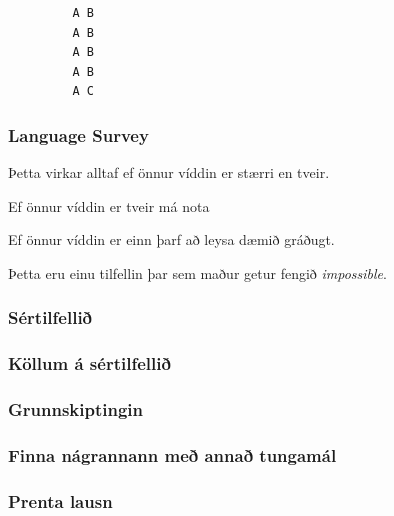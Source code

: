 { \begin{verbatim}
         A B
         A B
         A B
         A B
         A C
\end{verbatim} }

{
	\frametitle{Language Survey}
	{
		\item<1-> Þetta virkar alltaf ef önnur víddin er stærri en tveir.
		\item<2-> Ef önnur víddin er tveir má nota
		\item<3->[] \caseA
		\item<4-> Ef önnur víddin er einn þarf að leysa dæmið gráðugt.
		\item<5-> Þetta eru einu tilfellin þar sem maður getur fengið \emph{impossible}.
	}
}

{
	\frametitle{Sértilfellið}
}

{
	\frametitle{Köllum á sértilfellið}
}

{
	\frametitle{Grunnskiptingin}
}

{
	\frametitle{Finna nágrannann með annað tungamál}
}

{
	\frametitle{Prenta lausn}
}

{
}


